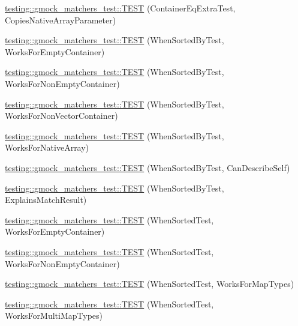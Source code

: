 \begin{DoxyCompactItemize}
\item 
\hyperlink{namespacetesting_1_1gmock__matchers__test_af7a978384d567d133240fb1899ec1658}{testing\+::gmock\+\_\+matchers\+\_\+test\+::\+T\+E\+ST} (Container\+Eq\+Extra\+Test, Copies\+Native\+Array\+Parameter)
\item 
\hyperlink{namespacetesting_1_1gmock__matchers__test_a9d88fbc6e2d01b66a1c10b192b25a802}{testing\+::gmock\+\_\+matchers\+\_\+test\+::\+T\+E\+ST} (When\+Sorted\+By\+Test, Works\+For\+Empty\+Container)
\item 
\hyperlink{namespacetesting_1_1gmock__matchers__test_a3095e5533ec12a67377dec6b0769d9a8}{testing\+::gmock\+\_\+matchers\+\_\+test\+::\+T\+E\+ST} (When\+Sorted\+By\+Test, Works\+For\+Non\+Empty\+Container)
\item 
\hyperlink{namespacetesting_1_1gmock__matchers__test_a24d3caacabfef918b7a5b9dacc5e3a66}{testing\+::gmock\+\_\+matchers\+\_\+test\+::\+T\+E\+ST} (When\+Sorted\+By\+Test, Works\+For\+Non\+Vector\+Container)
\item 
\hyperlink{namespacetesting_1_1gmock__matchers__test_a33b65fc6db83270b5c29073dbbf69c4e}{testing\+::gmock\+\_\+matchers\+\_\+test\+::\+T\+E\+ST} (When\+Sorted\+By\+Test, Works\+For\+Native\+Array)
\item 
\hyperlink{namespacetesting_1_1gmock__matchers__test_afc2d1e86837d8e3103748cb2e96b61c3}{testing\+::gmock\+\_\+matchers\+\_\+test\+::\+T\+E\+ST} (When\+Sorted\+By\+Test, Can\+Describe\+Self)
\item 
\hyperlink{namespacetesting_1_1gmock__matchers__test_ada0850ab21beccb47802aab36c06d163}{testing\+::gmock\+\_\+matchers\+\_\+test\+::\+T\+E\+ST} (When\+Sorted\+By\+Test, Explains\+Match\+Result)
\item 
\hyperlink{namespacetesting_1_1gmock__matchers__test_a76aaffd49c78fdee18f11fae5ea3f6fb}{testing\+::gmock\+\_\+matchers\+\_\+test\+::\+T\+E\+ST} (When\+Sorted\+Test, Works\+For\+Empty\+Container)
\item 
\hyperlink{namespacetesting_1_1gmock__matchers__test_a2bfbef7e777d319e3d96fc98340bb558}{testing\+::gmock\+\_\+matchers\+\_\+test\+::\+T\+E\+ST} (When\+Sorted\+Test, Works\+For\+Non\+Empty\+Container)
\item 
\hyperlink{namespacetesting_1_1gmock__matchers__test_acc4a96f3aa369fda8f554f5ac4495f4b}{testing\+::gmock\+\_\+matchers\+\_\+test\+::\+T\+E\+ST} (When\+Sorted\+Test, Works\+For\+Map\+Types)
\item 
\hyperlink{namespacetesting_1_1gmock__matchers__test_ab5de36ad02781be67163ae24d08b5454}{testing\+::gmock\+\_\+matchers\+\_\+test\+::\+T\+E\+ST} (When\+Sorted\+Test, Works\+For\+Multi\+Map\+Types)

\end{DoxyCompactItemize}
